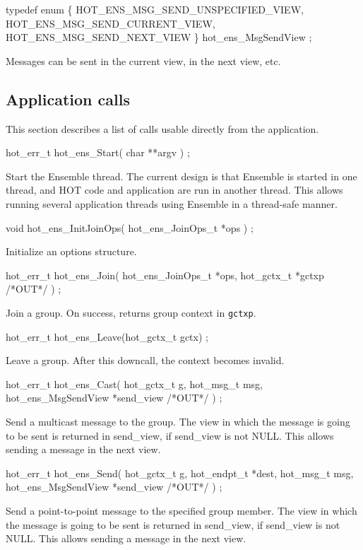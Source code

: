\begin{codebox}
typedef enum \{
  HOT_ENS_MSG_SEND_UNSPECIFIED_VIEW,
  HOT_ENS_MSG_SEND_CURRENT_VIEW,
  HOT_ENS_MSG_SEND_NEXT_VIEW
\} hot_ens_MsgSendView ;
\end{codebox}
Messages can be sent in the current view, in the next view, etc. 

\subsection{Application calls}
This section describes a list of calls usable directly from the
application. 

\begin{codebox}
hot_err_t hot_ens_Start(
  char **argv
) ;
\end{codebox}
Start the Ensemble thread. The current design is that Ensemble is
started in one thread, and HOT code and application are run in another
thread. This allows running several application threads using Ensemble
in a thread-safe manner. 

\begin{codebox}
void hot_ens_InitJoinOps(
  hot_ens_JoinOps_t *ops
) ;
\end{codebox}
Initialize an options structure. 

\begin{codebox}
hot_err_t hot_ens_Join(
  hot_ens_JoinOps_t *ops, 
  hot_gctx_t *gctxp /*OUT*/
) ;
\end{codebox}
Join a group.  On success, returns group context in {\tt *gctxp}.

\begin{codebox}
hot_err_t hot_ens_Leave(hot_gctx_t gctx) ;
\end{codebox}
Leave a group.  After this downcall, the context becomes invalid.

\begin{codebox}
hot_err_t hot_ens_Cast(
  hot_gctx_t g,
  hot_msg_t msg, 
  hot_ens_MsgSendView *send_view	/*OUT*/
) ;
\end{codebox}
Send a multicast message to the group.
The view in which the message is going to be sent
is returned in send\_view, if send\_view is not NULL.
This allows sending a message in the next view. 

\begin{codebox}
hot_err_t hot_ens_Send(
        hot_gctx_t g, 
   hot_endpt_t *dest,
   hot_msg_t msg,
   hot_ens_MsgSendView *send_view /*OUT*/
) ;
\end{codebox}
Send a point-to-point message to the specified group member.
The view in which the message is going to be sent
is returned in send\_view, if send\_view is not NULL.
This allows sending a message in the next view. 


